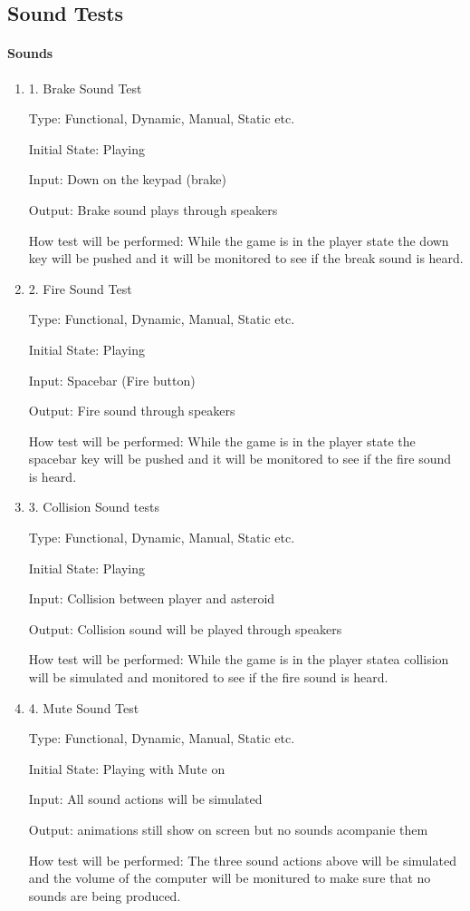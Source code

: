 \documentclass[12pt, titlepage]{article}
\begin{document}
\subsection{Sound Tests}

\paragraph{Sounds}

\begin{enumerate}
\item{1. Brake Sound Test\\}

Type: Functional, Dynamic, Manual, Static etc.

Initial State: Playing

Input: Down on the keypad (brake)

Output: Brake sound plays through speakers

How test will be performed: While the game is in the player state the down key will be pushed and it will be monitored to see if the break sound is heard.

\item{2. Fire Sound Test\\}

Type: Functional, Dynamic, Manual, Static etc.

Initial State: Playing

Input: Spacebar (Fire button)

Output: Fire sound through speakers

How test will be performed: While the game is in the player state the spacebar key will be pushed and it will be monitored to see if the fire sound is heard.

\item{3. Collision Sound tests\\}

Type: Functional, Dynamic, Manual, Static etc.

Initial State: Playing

Input: Collision between player and asteroid

Output: Collision sound will be played through speakers

How test will be performed: While the game is in the player statea collision will be simulated and monitored to see if the fire sound is heard.

\item{4. Mute Sound Test\\}

Type: Functional, Dynamic, Manual, Static etc.

Initial State: Playing with Mute on

Input: All sound actions will be simulated

Output: animations still show on screen but no sounds acompanie them

How test will be performed: The three sound actions above will be simulated and the volume of the computer will be monitured to make sure that no sounds are being produced.

\end{enumerate}
\end{document}
